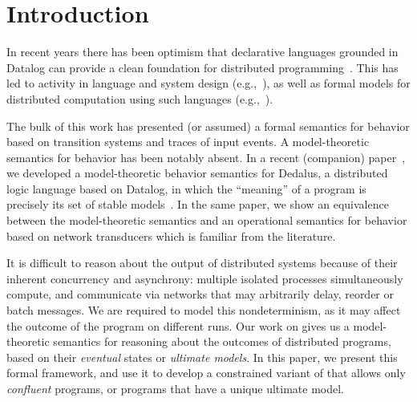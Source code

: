 \section{Introduction}

In recent years there has been optimism that declarative languages grounded in
Datalog can provide a clean foundation for distributed
programming~\cite{declarative-imperative}.  This has led to activity in language
and system design (e.g.,~\cite{boom,Belaramani:2009,Chu:2007,Loo2009-CACM}), as well as formal
models for distributed computation using such
languages (e.g.,~\cite{relational-transducers,navarro-oper-sem,card-abstraction}).

The bulk of this work has presented (or assumed) a formal semantics for behavior based on transition systems
and traces of input events.  A model-theoretic semantics for behavior has been notably absent.
In a recent (companion) paper~\cite{ameloot-operational}, we developed a model-theoretic behavior
semantics for Dedalus, a distributed logic language based on Datalog, in which the ``meaning''
of a program is precisely its set of stable models~\cite{sacca-zaniolo}. %
In the same paper, we show an equivalence between the model-theoretic semantics and an operational semantics for behavior based on network transducers which is familiar from the literature.

It is difficult to reason about the output of distributed systems because of their inherent concurrency and asynchrony: multiple 
isolated processes simultaneously compute, and communicate via networks that may arbitrarily delay, reorder or batch messages.
We are required to model this nondeterminism, as it may affect the outcome of the program on different runs.  Our work on
\lang gives us a model-theoretic semantics for reasoning about the outcomes of distributed programs, based on their \emph{eventual} states or \emph{ultimate models}.  In this paper, we present this formal framework, and use it to develop a constrained variant
of \lang that allows only \emph{confluent} programs, or programs that have a unique ultimate model.


